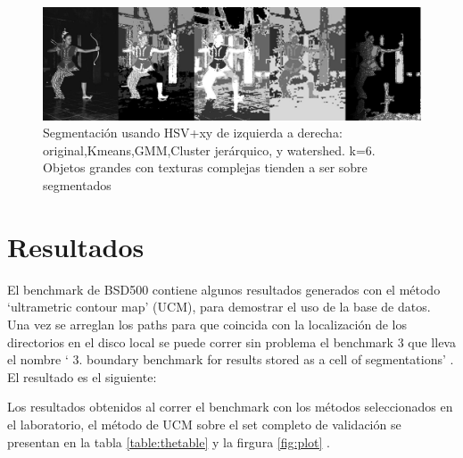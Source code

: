 \documentclass[10pt,twocolumn,letterpaper]{article}
\begin{document}
\begin{figure}
\begin{center}
\includegraphics[width=0.95\linewidth]
                {img/woman.jpg}
\end{center}
\caption{Segmentación usando HSV+xy de izquierda a derecha: original,Kmeans,GMM,Cluster jerárquico, y watershed. k=6. Objetos grandes con texturas complejas tienden a ser sobre segmentados}
\label{fig:woman}
\end{figure}


\section{Resultados}

El benchmark de BSD500 contiene algunos resultados generados con el método ‘ultrametric contour map’ (UCM), para demostrar el uso de la base de datos. Una vez se arreglan los paths para que coincida con la localización de los directorios en el disco local se puede correr sin problema el benchmark 3 que lleva el nombre ‘ 3. boundary benchmark for results stored as a cell of segmentations’ . El resultado es el siguiente:




Los resultados obtenidos al correr el benchmark con los métodos seleccionados en el laboratorio, el método de UCM sobre el set completo de validación se presentan en la tabla \ref{table:thetable} y la firgura \ref{fig:plot} .
\end{document}
